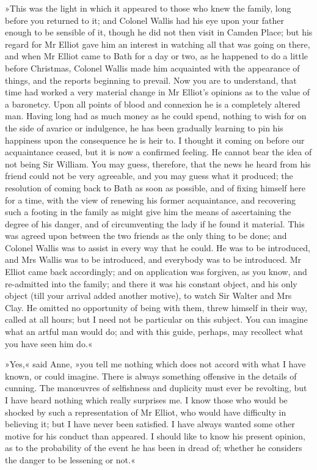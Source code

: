 »This was the light in which it appeared to those who knew the family, long before you returned to it; and Colonel Wallis had his eye upon your father enough to be sensible of it, though he did not then visit in Camden Place; but his regard for Mr Elliot gave him an interest in watching all that was going on there, and when Mr Elliot came to Bath for a day or two, as he happened to do a little before Christmas, Colonel Wallis made him acquainted with the appearance of things, and the reports beginning to prevail. Now you are to understand, that time had worked a very material change in Mr Elliot's opinions as to the value of a baronetcy. Upon all points of blood and connexion he is a completely altered man. Having long had as much money as he could spend, nothing to wish for on the side of avarice or indulgence, he has been gradually learning to pin his happiness upon the consequence he is heir to. I thought it coming on before our acquaintance ceased, but it is now a confirmed feeling. He cannot bear the idea of not being Sir William. You may guess, therefore, that the news he heard from his friend could not be very agreeable, and you may guess what it produced; the resolution of coming back to Bath as soon as possible, and of fixing himself here for a time, with the view of renewing his former acquaintance, and recovering such a footing in the family as might give him the means of ascertaining the degree of his danger, and of circumventing the lady if he found it material. This was agreed upon between the two friends as the only thing to be done; and Colonel Wallis was to assist in every way that he could. He was to be introduced, and Mrs Wallis was to be introduced, and everybody was to be introduced. Mr Elliot came back accordingly; and on application was forgiven, as you know, and re-admitted into the family; and there it was his constant object, and his only object (till your arrival added another motive), to watch Sir Walter and Mrs Clay. He omitted no opportunity of being with them, threw himself in their way, called at all hours; but I need not be particular on this subject. You can imagine what an artful man would do; and with this guide, perhaps, may recollect what you have seen him do.«

»Yes,« said Anne, »you tell me nothing which does not accord with what I have known, or could imagine. There is always something offensive in the details of cunning. The manœuvres of selfishness and duplicity must ever be revolting, but I have heard nothing which really surprises me. I know those who would be shocked by such a representation of Mr Elliot, who would have difficulty in believing it; but I have never been satisfied. I have always wanted some other motive for his conduct than appeared. I should like to know his present opinion, as to the probability of the event he has been in dread of; whether he considers the danger to be lessening or not.«

